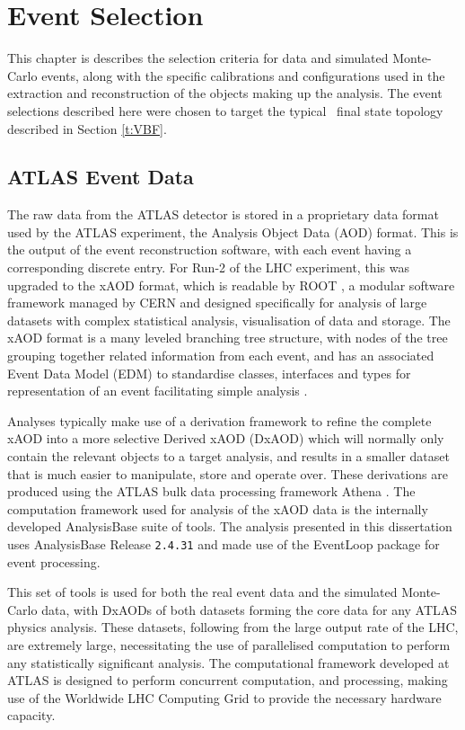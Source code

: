 \chapter{Event Selection}\label{c:ES}

	This chapter is describes the selection criteria for data and simulated Monte-Carlo events, along with the specific calibrations and configurations used in the extraction and reconstruction of the objects making up the analysis. The event selections described here were chosen to target the typical \VBFHBB\, final state topology described in Section \ref{t:VBF}.

	\section{ATLAS Event Data}

	The raw data from the ATLAS detector is stored in a proprietary data format used by the ATLAS experiment, the Analysis Object Data (AOD) format. This is the output of the event reconstruction software, with each event having a corresponding discrete entry. For Run-2 of the LHC experiment, this was upgraded to the xAOD format, which is readable by ROOT \cite{ROOT}, a modular software framework managed by CERN and designed specifically for analysis of large datasets with complex statistical analysis, visualisation of data and storage. The xAOD format is a many leveled branching tree structure, with nodes of the tree grouping together related information from each event, and has an associated Event Data Model (EDM) to standardise classes, interfaces and types for representation of an event facilitating simple analysis \cite{xAOD}.

	Analyses typically make use of a derivation framework to refine the complete xAOD into a more selective Derived xAOD (DxAOD) which will normally only contain the relevant objects to a target analysis, and results in a smaller dataset that is much easier to manipulate, store and operate over. These derivations are produced using the ATLAS bulk data processing framework Athena \cite{athena}. The computation framework used for analysis of the xAOD data is the internally developed AnalysisBase suite of tools. The analysis presented in this dissertation uses AnalysisBase Release \texttt{2.4.31} and made use of the EventLoop package for event processing.

	This set of tools is used for both the real event data and the simulated Monte-Carlo data, with DxAODs of both datasets forming the core data for any ATLAS physics analysis. These datasets, following from the large output rate of the LHC, are extremely large, necessitating the use of parallelised computation to perform any statistically significant analysis. The computational framework developed at ATLAS is designed to perform concurrent computation, and processing, making use of the Worldwide LHC Computing Grid \cite{grid} to provide the necessary hardware capacity.

